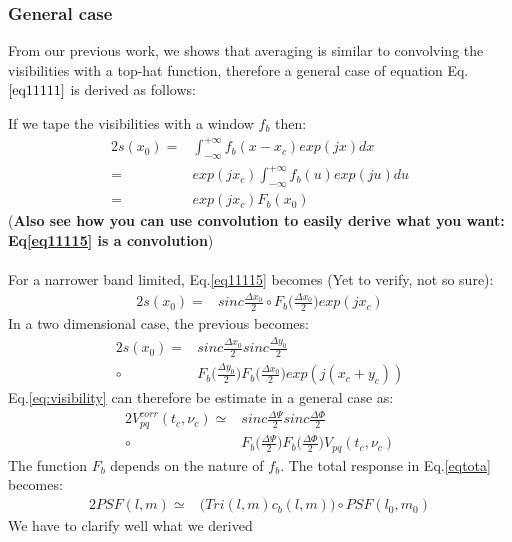 \subsubsection{General case}
From our previous work, we shows that averaging is similar to convolving the visibilities with a top-hat function, therefore a general 
case of equation Eq. $\ref{eq11111}$ is derived as follows:

If we tape the visibilities with a window $f_b$ then:
\begin{alignat}{2}
s(x_0) =& \int_{-\infty}^{+\infty}f_{b}(x-x_c)exp(jx)dx \\
        =& exp(jx_c)\int_{-\infty}^{+\infty}f_{b}(u)exp(ju)du\\
        =& exp(jx_c)F_b(x_0)\label{eq11115}
\end{alignat}
(\textbf{Also see how you can use convolution to easily derive what you want: Eq\ref{eq11115} is a convolution})\\
\\
For a narrower band limited, Eq.\ref{eq11115}  becomes (Yet to verify, not so sure):
\begin{alignat}{2}
s(x_0)=&  sinc\frac{\Delta x_0}{2}\circ F_{b}\bigg(\frac{\Delta x_0}{2}\bigg)exp(j x_c)
\end{alignat}
In a two dimensional case, the previous becomes:
\begin{alignat}{2}
s(x_0)=&  sinc\frac{\Delta x_0}{2}sinc\frac{\Delta y_0}{2}\\
      \circ& F_{b}\bigg(\frac{\Delta y_0}{2}\bigg)F_{b}\bigg(\frac{\Delta 
x_0}{2}\bigg)exp(j (x_c+y_c))
\end{alignat}
Eq.\ref{eq:visibility} can therefore be estimate in a general case as:
\begin{alignat}{2}
 V_{pq}^{corr}(t_c, \nu_c)\simeq&sinc\frac{\Delta \Psi}{2}sinc\frac{\Delta \Phi}{2}\\
			  \circ&F_{b}\bigg(\frac{\Delta\Psi}{2}\bigg)F_{b}\bigg(\frac{\Delta \Phi}{2}\bigg) V_{pq}(t_{c},\nu_{c})
\end{alignat}
The function $F_b$ depends on the nature of $f_b$. The total response in Eq.\ref{eqtota} becomes:
\begin{alignat}{2}
PSF(l,m)\simeq&  \bigg(Tri(l,m)c_b(l,m)\bigg)\circ PSF(l_0,m_0)
\end{alignat}
We have to clarify well what we derived
